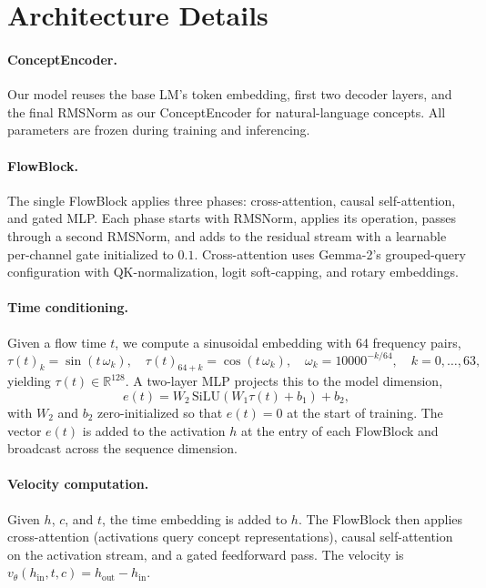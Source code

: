 \documentclass{article}
\newcommand{\vt}{v_\theta}
\begin{document}
\section{Architecture Details}
\label{app:architecture}

\paragraph{ConceptEncoder.}
Our model reuses the base LM's token embedding, first two decoder layers, and the final RMSNorm as our ConceptEncoder for natural-language concepts. All parameters are frozen during training and inferencing.

\paragraph{FlowBlock.}
The single FlowBlock applies three phases: cross-attention, causal self-attention, and gated MLP. Each phase starts with RMSNorm, applies its operation, passes through a second RMSNorm, and adds to the residual stream with a learnable per-channel gate initialized to $0.1$. Cross-attention uses Gemma-2's grouped-query configuration with QK-normalization, logit soft-capping, and rotary embeddings.

\paragraph{Time conditioning.}
Given a flow time $t$, we compute a sinusoidal embedding with 64 frequency pairs,
\[
\tau(t)_k = \sin(t \, \omega_k), \quad \tau(t)_{64+k} = \cos(t \, \omega_k), \quad \omega_k = 10000^{-k/64}, \quad k = 0, \ldots, 63,
\]
yielding $\tau(t) \in \mathbb{R}^{128}$. A two-layer MLP projects this to the model dimension,
\[
e(t) = W_2 \, \mathrm{SiLU}(W_1 \tau(t) + b_1) + b_2,
\]
with $W_2$ and $b_2$ zero-initialized so that $e(t) = 0$ at the start of training. The vector $e(t)$ is added to the activation $h$ at the entry of each FlowBlock and broadcast across the sequence dimension.

\paragraph{Velocity computation.}
Given $h$, $c$, and $t$, the time embedding is added to $h$. The FlowBlock then applies cross-attention (activations query concept representations), causal self-attention on the activation stream, and a gated feedforward pass. The velocity is $\vt(h_\text{in}, t, c) = h_{\text{out}} - h_\text{in}$.
\end{document}
